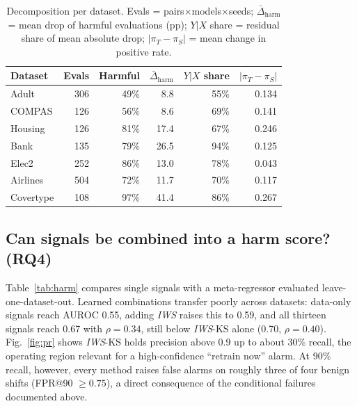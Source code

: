 \documentclass[conference]{IEEEtran}
\theoremstyle{plainhead}
\newcommand{\iws}{\textit{IWS}}
\begin{document}
\begin{table}[t]
\centering
\caption{Decomposition per dataset. Evals = pairs$\times$models$\times$seeds; $\bar\Delta_\text{harm}$ = mean drop of harmful evaluations (pp); $Y|X$ share = residual share of mean absolute drop; $|\pi_T-\pi_S|$ = mean change in positive rate.}
\label{tab:decomp}
\footnotesize
\setlength{\tabcolsep}{3.5pt}
\begin{tabular}{lrrrrr}
\toprule
Dataset & Evals & Harmful & $\bar\Delta_{\text{harm}}$ & $Y|X$ share & $|\pi_T-\pi_S|$ \\
\midrule
Adult & 306 & 49\% & 8.8 & 55\% & 0.134 \\
COMPAS & 126 & 56\% & 8.6 & 69\% & 0.141 \\
Housing & 126 & 81\% & 17.4 & 67\% & 0.246 \\
Bank & 135 & 79\% & 26.5 & 94\% & 0.125 \\
Elec2 & 252 & 86\% & 13.0 & 78\% & 0.043 \\
Airlines & 504 & 72\% & 11.7 & 70\% & 0.117 \\
Covertype & 108 & 97\% & 41.4 & 86\% & 0.267 \\
\bottomrule
\end{tabular}
\end{table}

\subsection{Can signals be combined into a harm score? (RQ4)}
Table~\ref{tab:harm} compares single signals with a meta-regressor evaluated leave-one-dataset-out. Learned combinations transfer poorly across datasets: data-only signals reach AUROC 0.55, adding \iws{} raises this to 0.59, and all thirteen signals reach 0.67 with $\rho=0.34$, still below \iws{}-KS alone (0.70, $\rho=0.40$). Fig.~\ref{fig:pr} shows \iws{}-KS holds precision above 0.9 up to about 30\% recall, the operating region relevant for a high-confidence ``retrain now'' alarm. At 90\% recall, however, every method raises false alarms on roughly three of four benign shifts (FPR@90 $\ge0.75$), a direct consequence of the conditional failures documented above.
\end{document}

